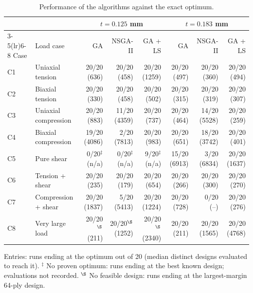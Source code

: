 \begin{table}[htbp]
\centering
\caption{Performance of the algorithms against the exact optimum.}
\label{tab:convergence}
\begin{tabular}{llrrrrrr}
\toprule
& & \multicolumn{3}{c}{$t = 0.125$ mm} & \multicolumn{3}{c}{$t = 0.183$ mm} \\ \cmidrule(lr){3-5}\cmidrule(lr){6-8}
Case & Load case & GA & NSGA-II & GA + LS & GA & NSGA-II & GA + LS \\
\midrule
C1 & Uniaxial tension & 20/20 (636) & 20/20 (458) & 20/20 (1259) & 20/20 (497) & 20/20 (360) & 20/20 (494) \\
C2 & Biaxial tension & 20/20 (330) & 20/20 (458) & 20/20 (502) & 20/20 (315) & 20/20 (319) & 20/20 (307) \\
C3 & Uniaxial compression & 20/20 (883) & 11/20 (4359) & 20/20 (737) & 20/20 (464) & 14/20 (5528) & 20/20 (259) \\
C4 & Biaxial compression & 19/20 (4086) & 2/20 (7813) & 20/20 (983) & 20/20 (651) & 18/20 (3742) & 20/20 (401) \\
C5 & Pure shear & 0/20$^{\ddagger}$ (n/a) & 0/20$^{\ddagger}$ (n/a) & 9/20$^{\ddagger}$ (n/a) & 15/20 (6913) & 3/20 (6834) & 20/20 (1637) \\
C6 & Tension + shear & 20/20 (235) & 20/20 (179) & 20/20 (654) & 20/20 (266) & 20/20 (300) & 20/20 (270) \\
C7 & Compression + shear & 20/20 (1837) & 5/20 (5413) & 20/20 (1224) & 20/20 (728) & 0/20 (–) & 20/20 (276) \\
C8 & Very large load & 20/20$^{\S}$ (211) & 20/20$^{\S}$ (1252) & 20/20$^{\S}$ (2340) & 20/20 (211) & 20/20 (1565) & 20/20 (4768) \\
\bottomrule
\end{tabular}
\par\smallskip
{\footnotesize Entries: runs ending at the optimum out of 20 (median distinct designs evaluated to reach it). $^{\ddagger}$ No proven optimum: runs ending at the best known design; evaluations not recorded. $^{\S}$ No feasible design: runs ending at the largest-margin 64-ply design.}
\end{table}
